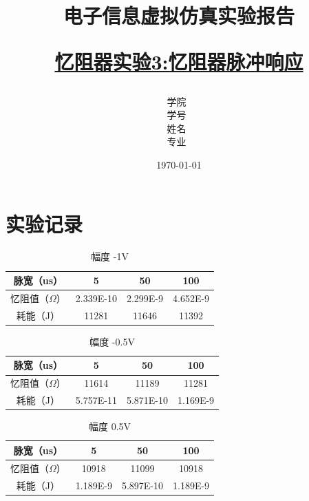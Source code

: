 \documentclass[12pt,hyperref,a4paper,UTF8]{ctexart}
\title{ 
        \vspace{1cm}
        \heiti \Huge \textbf{电子信息虚拟仿真实验报告} \par
        \vspace{1cm} 
        \heiti \Large {\underline{忆阻器实验3:忆阻器脉冲响应}   } 
        \vspace{3cm}
    
    }
\author{
        \vspace{0.5cm}
        \kaishu\Large 学院\ \dlmu[9cm]{卓越学院} \\ %
        \vspace{0.5cm}
        \kaishu\Large 学号\ \dlmu[9cm]{23040447} \\ %
        \vspace{0.5cm}
        \kaishu\Large 姓名\ \dlmu[9cm]{陈文轩} \qquad  \\ %
        \vspace{0.5cm}
        \kaishu\Large 专业\ \dlmu[9cm]{智能硬件与系统(电子信息工程)} \qquad \\ %
    }
\date{\today} %
\begin{document}
\cover
\thispagestyle{empty} %







\newpage
\setcounter{page}{1} %


\section{实验记录}

\begin{table}[H]
    \centering
    \caption{幅度 -1V}
    \begin{tabular}{|c|c|c|c|}
        \hline
        脉宽（us） & 5 & 50 & 100 \\ \hline
        忆阻值（$\Omega$） &2.339E-10 &2.299E-9 &4.652E-9 \\ \hline
        耗能（J） &11281 &11646 &11392 \\ \hline
    \end{tabular}
\end{table}

\begin{table}[H]
    \centering
    \caption{幅度 -0.5V}
    \begin{tabular}{|c|c|c|c|}
        \hline
        脉宽（us） & 5 & 50 & 100 \\ \hline
        忆阻值（$\Omega$） &11614 &11189 &11281 \\ \hline
        耗能（J） &5.757E-11 &5.871E-10 &1.169E-9 \\ \hline
    \end{tabular}
\end{table}

\begin{table}[H]
    \centering
    \caption{幅度 0.5V}
    \begin{tabular}{|c|c|c|c|}
        \hline
        脉宽（us） & 5 & 50 & 100 \\ \hline
        忆阻值（$\Omega$） & 10918& 11099& 10918 \\ \hline
        耗能（J） &1.189E-9 &5.897E-10& 1.189E-9 \\ \hline
    \end{tabular}
\end{table}
\end{document}
